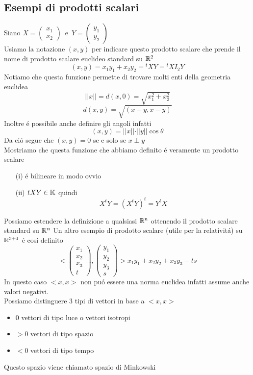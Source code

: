 \newpage
\subsection{Esempi di prodotti scalari}
Siano $X = \begin{pmatrix}
x_1 \\ x_2 \end{pmatrix}\, \text{ e } \, Y=\begin{pmatrix} y_1 \\ y_2 \end{pmatrix}
$ \\
Usiamo la notazione $(x,y)$ per indicare questo prodotto scalare che prende il nome di prodotto scalare euclideo standard su $\mathbb{R}^2$
$$ (x,y) = x_1y_1 + x_2 y_2 = {}^t X Y = {}^t X I_2 Y $$
Notiamo che questa funzione permette di trovare molti enti della geometria euclidea\\
$$ \vert \vert x \vert \vert = d(x,0) = \sqrt{x_1^2 + x_2^2 } $$
$$ d(x,y)  = \sqrt{(x-y,x-y)}$$
Inoltre \'e possibile anche definire gli angoli infatti 
$$ (x,y) = \vert \vert x \vert \vert \cdot \vert \vert y \vert \vert \cos \theta $$
Da ci\'o segue che $(x,y) = 0$ se e solo se $ x \perp y $
\\ 
Mostriamo che questa funzione che abbiamo definito \'e veramente un prodotto scalare
\begin{itemize}
\item[(i)] \'e bilineare in modo ovvio
\item[(ii)] $^{} t X Y \in \mathbb{K} $ quindi 
$$  X^t Y =  \left( X^t Y \right)^t = Y^t X $$
\end{itemize}
\spazio
 Possiamo estendere la definizione a qualsiasi $\mathbb{R}^n$ ottenendo il prodotto scalare standard su $\mathbb{R}^n$
\spazio
Un altro esempio di prodotto scalare (utile per la relativit\'a) su $\mathbb{R}^{3+1} $ \'e cos\'i definito
$$ < \begin{pmatrix}
x_1 \\ x_2 \\ x_3 \\ t  
\end{pmatrix} , \begin{pmatrix}
y_1 \\ y_2 \\ y_3 \\ s 
\end{pmatrix} > x_1 y_1 + x_2y_2 + x_3 y_3 -ts $$
In questo caso $<x,x>$ non pu\'o essere una norma euclidea infatti assume anche valori negativi.\\
Possiamo distinguere 3 tipi di vettori in base a $<x,x> $
\begin{itemize}
\item $0$ vettori di tipo luce o vettori isotropi
\item $>0$ vettori di tipo spazio
\item $<0$ vettori di tipo tempo
\end{itemize}
Questo spazio viene chiamato spazio di Minkowski 
\newpage

